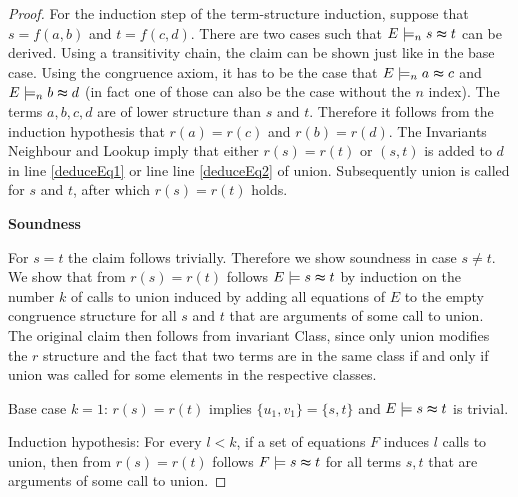 \begin{proof}
For the induction step of the term-structure induction, suppose that $s = f(a,b)$ and $t = f(c,d)$.
There are two cases such that $E \models_n s \thickapprox t$ can be derived.
Using a transitivity chain, the claim can be shown just like in the base case.
Using the congruence axiom, it has to be the case that $E \models_n a \thickapprox c$ and $E \models_n b \thickapprox d$ (in fact one of those can also be the case without the $n$ index).
The terms $a,b,c,d$ are of lower structure than $s$ and $t$.
Therefore it follows from the induction hypothesis that $r(a) = r(c)$ and $r(b) = r(d)$.
The Invariants Neighbour and Lookup imply that either $r(s) = r(t)$ or $(s,t)$ is added to $d$ in line \ref{deduceEq1} or line line \ref{deduceEq2} of union.
Subsequently union is called for $s$ and $t$, after which $r(s) = r(t)$ holds.

\textbf{Soundness}

For $s = t$ the claim follows trivially.
Therefore we show soundness in case $s \neq t$.
We show that from $r(s) = r(t)$ follows $E \models s \thickapprox t$ by induction on the number $k$ of calls to union induced by adding all equations of $E$ to the empty congruence structure for all $s$ and $t$ that are arguments of some call to union.
The original claim then follows from invariant Class, since only union modifies the $r$ structure and the fact that two terms are in the same class if and only if union was called for some elements in the respective classes.

Base case $k = 1$: $r(s) = r(t)$ implies $\{u_1,v_1\} = \{s,t\}$ and $E \models s \thickapprox t$ is trivial.


Induction hypothesis: For every $l < k$, if a set of equations $F$ induces $l$ calls to union, then from $r(s) = r(t)$ follows $F \models s \thickapprox t$ for all terms $s,t$ that are arguments of some call to union.


\end{proof}

